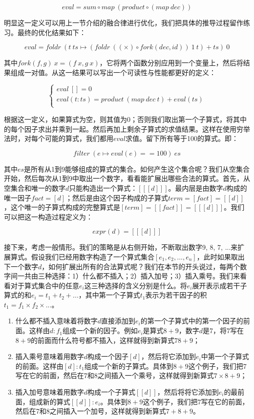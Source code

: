 \documentclass[b5paper]{ctexart}
\begin{document}
\[
eval = sum \circ map\ (product \circ (map\ dec))
\]

明显这一定义可以用上一节介绍的融合律进行优化，我们把具体的推导过程留作练习。最终的优化结果如下：

\[
eval = foldr\ (t\ ts \mapsto (foldr\ ((\times) \circ fork(dec, id))\ 1\ t) + ts)\ 0
\]

其中$fork(f, g)\ x = (f\ x, g\ x)$，它将两个函数分别应用到一个变量上，然后将结果组成一对值。从这一结果可以写出一个可读性与性能都更好的定义：

\[
\begin{cases}
eval\ [] = 0 \\
eval (t:ts) = product\ (map\ dec\ t) + eval(ts) \\
\end{cases}
\]

根据这一定义，如果算式为空，则其值为0；否则我们取出第一个子算式，将其中的每个因子求出并乘到一起。然后再加上剩余子算式的求值结果。这样在使用穷举法时，对每个可能的算式，我们都用$eval$求值。留下所有等于100的算式。即：

\[
filter\ (e \mapsto eval(e) == 100)\ es
\]

其中$es$是所有从1到9能够组成的算式的集合。如何产生这个集合呢？我们从空集合开始，然后每次从1到9中取出一个数字，看看能扩展出哪些合法的算式。首先，从空集合和唯一的数字$d$只能构造出一个算式：$[[[d]]]$。最内层是由数字$d$构成的唯一因子$fact = [d]$；然后是由这个因子构成的子算式$term = [fact] = [[d]]$，这个唯一的子算式构成的完整算式是$[term] = [[fact]] = [[[d]]]$。我们可以把这一构造过程定义为：

\[
expr(d) = [[[d]]]
\]

接下来，考虑一般情形。我们的策略是从右侧开始，不断取出数字9, 8, 7, ...来扩展算式。假设我们已经用数字构造了一个算式集合$[e_1, e_2, ..., e_n]$，此时如果取出下一个数字$d$，如何扩展出所有的合法算式呢？我们在本节的开头说过，每两个数字间一共由三种选择：1）什么都不插入；2）插入加号；3）插入乘号。我们来看看对于算式集合中的任意$e_i$这三种选择的含义分别是什么。将$e_i$展开表示成若干子算式的和$e_i = t_1 + t_2 + ...$，其中第一个子算式$t_1$表示为若干因子的积$t_1 = f_1 \times f_2 \times ...$。

\begin{enumerate}
\item 什么都不插入意味着将数字$d$直接添加到$e_i$的第一个子算式中的第一个因子的前面。这样由$d:f_1$组成一个新的因子。例如$e_i$是算式$8 + 9$，数字$d$是7，将7写在$8+9$的前面而什么符号都不插入，这样就得到新算式$78 + 9$；
\item 插入乘号意味着用数字$d$构成一个因子$[d]$，然后将它添加到$e_i$中第一个子算式的前面。这样由$[d]:t_1$组成一个新的子算式。具体到$8 + 9$这个例子，我们把7写在它的前面，然后在7和8之间插入一个乘号，这样就得到新算式$7 \times 8 + 9$；
\item 插入加号意味着用数字$d$构成一个子算式$[[d]]$，然后将将它添加到$e_i$的最前面，组成新的算式$[[d]]:e_i$。具体到$8 + 9$这个例子，我们把7写在它的前面，然后在7和8之间插入一个加号，这样就得到新算式$7 + 8 + 9$。
\end{enumerate}
\end{document}
